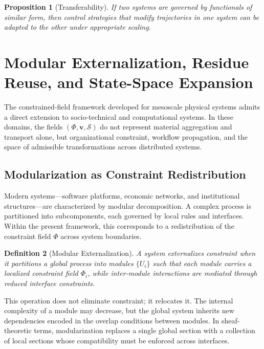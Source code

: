 \documentclass[11pt, a4paper, twocolumn]{article}
\newtheorem{definition}{Definition}[section]
\newtheorem{proposition}[definition]{Proposition}
\newcommand{\Sfield}{\mathcal{S}}
\begin{document}
\begin{proposition}[Transferability]
If two systems are governed by functionals of similar form, then control
strategies that modify trajectories in one system can be adapted to the other
under appropriate scaling.
\end{proposition}

\section{Modular Externalization, Residue Reuse, and State-Space Expansion}

The constrained-field framework developed for mesoscale physical systems
admits a direct extension to socio-technical and computational systems. In
these domains, the fields $(\Phi,\mathbf{v},\Sfield)$ do not represent
material aggregation and transport alone, but organizational constraint,
workflow propagation, and the space of admissible transformations across
distributed systems.

\subsection{Modularization as Constraint Redistribution}

Modern systems---software platforms, economic networks, and institutional
structures---are characterized by modular decomposition. A complex process is
partitioned into subcomponents, each governed by local rules and interfaces.
Within the present framework, this corresponds to a redistribution of the
constraint field $\Phi$ across system boundaries.

\begin{definition}[Modular Externalization]
A system externalizes constraint when it partitions a global process into
modules $\{U_i\}$ such that each module carries a localized constraint field
$\Phi_i$, while inter-module interactions are mediated through reduced
interface constraints.
\end{definition}

This operation does not eliminate constraint; it relocates it. The internal
complexity of a module may decrease, but the global system inherits new
dependencies encoded in the overlap conditions between modules. In sheaf-
theoretic terms, modularization replaces a single global section with a
collection of local sections whose compatibility must be enforced across
interfaces.
\end{document}
